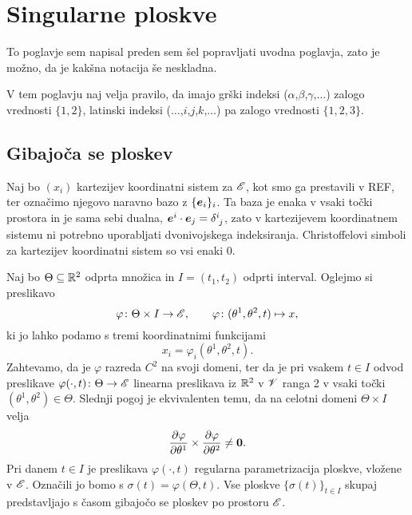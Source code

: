 \chapter{Singularne ploskve}


\begin{rdece}
To poglavje sem napisal preden sem šel popravljati uvodna poglavja, zato je
možno, da je kakšna notacija še neskladna.
\end{rdece}

V tem poglavju naj velja pravilo, da imajo grški indeksi ($\alpha$,$\beta$,$\gamma$,$\dots$) zalogo
vrednosti $\{1,2\}$, latinski indeksi ($\dots$,$i$,$j$,$k$,$\dots$) pa zalogo vrednosti $\{1,2,3\}$.


\section{Gibajoča se ploskev}


Naj bo $(x_i)$ kartezijev koordinatni sistem za $\mathscr E$, kot smo ga prestavili v REF, ter označimo
njegovo naravno bazo z $\{\boldsymbol e_i\}_i$. Ta baza je enaka v vsaki točki prostora in je sama
sebi dualna, $\vek{e}^i\cdot\vek{e}_j=\topbot{\delta}{i}{j}$, zato v kartezijevem
koordinatnem sistemu ni potrebno uporabljati dvonivojskega indeksiranja.
Christoffelovi simboli za kartezijev koordinatni sistem so vsi enaki 0.

Naj bo $\Theta\subseteq\mathbb R^2$ odprta množica in $I=(t_1,t_2)$ odprti interval.
Oglejmo si preslikavo
\begin{equation} \label{e:pargip}
	\varphi\colon\Theta\times I\to\mathscr E,\qquad \varphi\colon(\theta^1,\theta^2,t)\mapsto x,
\end{equation}
ki jo lahko podamo s tremi koordinatnimi funkcijami
\[
	x_i=\varphi_i(\theta^1,\theta^2,t).
\]
Zahtevamo, da je $\varphi$ razreda $C^2$ na svoji domeni, ter da je pri vsakem $t\in I$ 
odvod preslikave $\varphi(\cdot,t)\colon \Theta\to\mathscr E$ linearna preslikava iz $\mathbb R^2$ v $\mathscr V$ ranga 2 v vsaki
točki $(\theta^1,\theta^2)\in\Theta$. Slednji pogoj je ekvivalenten temu, da na celotni domeni
$\Theta\times I$ velja
\[ \frac{\partial\varphi}{\partial\theta^1}\times\frac{\partial\varphi}{\partial\theta^2}\neq \boldsymbol 0. \]
Pri danem $t\in I$ je preslikava $\varphi(\cdot,t)$ regularna parametrizacija ploskve,
vložene v $\mathscr E$. Označili jo bomo s $\sigma(t)=\varphi(\Theta,t)$. Vse ploskve $\{\sigma(t)\}_{t\in I}$
skupaj predstavljajo s časom gibajočo se ploskev po prostoru $\mathscr E$.

